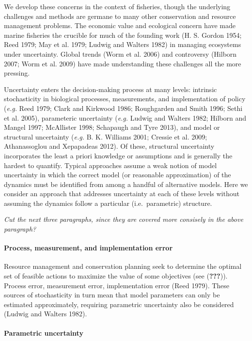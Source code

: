 \documentclass[author-year, review]{elsarticle} %
\begin{document}
We develop these concerns in the context of fisheries, though the
underlying challenges and methods are germane to many other conservation
and resource management problems. The economic value and ecological
concern have made marine fisheries the crucible for much of the founding
work (H. S. Gordon 1954; Reed 1979; May et al. 1979; Ludwig and Walters
1982) in managing ecosystems under uncertainty. Global trends (Worm et
al. 2006) and controversy (Hilborn 2007; Worm et al. 2009) have made
understanding these challenges all the more pressing.

Uncertainty enters the decision-making process at many levels: intrinsic
stochasticity in biological processes, measurements, and implementation
of policy (\emph{e.g.} Reed 1979; Clark and Kirkwood 1986; Roughgarden
and Smith 1996; Sethi et al. 2005), parameteric uncertainty (\emph{e.g.}
Ludwig and Walters 1982; Hilborn and Mangel 1997; McAllister 1998;
Schapaugh and Tyre 2013), and model or structural uncertainty
(\emph{e.g.} B. K. Williams 2001; Cressie et al. 2009; Athanassoglou and
Xepapadeas 2012). Of these, structural uncertainty incorporates the
least a priori knowledge or assumptions and is generally the hardest to
quantify. Typical approaches assume a weak notion of model uncertainty
in which the correct model (or reasonable approximation) of the dynamics
must be identified from among a handful of alternative models. Here we
consider an approach that addresses uncertainty at each of these levels
without assuming the dynamics follow a particular (i.e.~parametric)
structure.

\emph{Cut the next three paragraphs, since they are covered more
consisely in the above paragraph?}

\paragraph{Process, measurement, and implementation
error}\label{process-measurement-and-implementation-error}

Resource management and conservation planning seek to determine the
optimal set of feasible actions to maximize the value of some objectives
(see ({\textbf{???}})). Process error, measurement error, implementation
error (Reed 1979). These sources of stochasticity in turn mean that
model parameters can only be estimated approximately, requiring
parametric uncertainty also be considered (Ludwig and Walters 1982).

\paragraph{Parametric uncertainty}\label{parametric-uncertainty}
\end{document}
